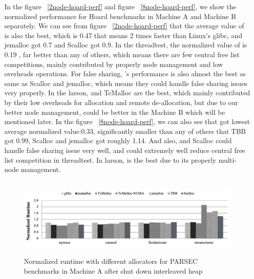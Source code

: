 In the figure ~\ref{2node-hoard-perf} and figure ~\ref{8node-hoard-perf}, we show the normalized performance for Hoard benchmarks in Machine A and Machine B separately. We can see from figure ~\ref{2node-hoard-perf} that the average value of \NM{} is also the best, which is 0.47 that means 2 times faster than Linux's glibc, and jemalloc got 0.7 and Scalloc got 0.9. In the threadtest, the normalized value of \NM{} is 0.19 , far better than any of others, which means there are few central free list competitions, mainly contributed by properly node management and low overheads operations. For false sharing, \NM{}'s performance is also almost the best as same as Scalloc and jemalloc, which means they could handle false sharing issues very properly. In the larson, \NM{} and TcMalloc are the best, which mainly contributed by their low overheads for allocation and remote de-allocation, but due to our better node management, \NM{} could be better in the Machine B which will be mentioned later. In the figure ~\ref{8node-hoard-perf}, we can also see that \NM{} got lowest average normalized value:0.33, significantly smaller than any of others that TBB got 0.99, Scalloc and jemalloc got roughly 1.14. And also, \NM{} and Scalloc could handle false sharing issue very well, and \NM{} could extremely well reduce central free list competition in threadtest. In larson, \NM{} is the best due to its properly multi-node management. 
\begin{figure}[H]
    \centering
    \includegraphics[width=\textwidth,height=150]{figure/2-node-no-interleaved.png}
    \caption{Normalized runtime with different allocators for PARSEC benchmarks in Machine A after shut down interleaved heap}
    \label{2node-parsec-no-interleaved-perf}
\end{figure}

